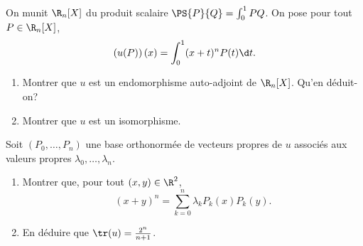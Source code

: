 \begin{enonce}
\begin{exercise}[ID={RMS135 E904},subtitle={Mines-Ponts PSI 2024},tags={oraux},difficulty={}]
  On munit $\R_n[X]$ du produit scalaire $\PS{P}{Q} = \int_0^1 PQ$.
  On pose pour tout $P\in\R_n[X]$,
  \begin{equation*}
    \left( u(P) \right)(x) = \int_0^1 (x+t)^n P(t) \d t.
  \end{equation*}

  \begin{enumerate}
    \item Montrer que $u$ est un endomorphisme auto-adjoint de $\R_n[X]$.
      Qu'en déduit-on?

    \item Montrer que $u$ est un isomorphisme.
  \end{enumerate}

  Soit $(P_0,\dots,P_n)$ une base orthonormée de vecteurs propres de $u$ associés aux valeurs propres $\lambda_0,\dots,\lambda_n$.

  \begin{enumerate}[resume]
    \item Montrer que, pour tout $(x,y)\in\R^2$,
      \begin{equation*}
        (x+y)^n = \sum_{k=0}^n \lambda_k P_k(x) P_k(y).
      \end{equation*}

    \item En déduire que $\tr(u) = \frac{2^n}{n+1}$.
  \end{enumerate}
\end{exercise}
\begin{solution}
\end{solution}
\end{enonce}
